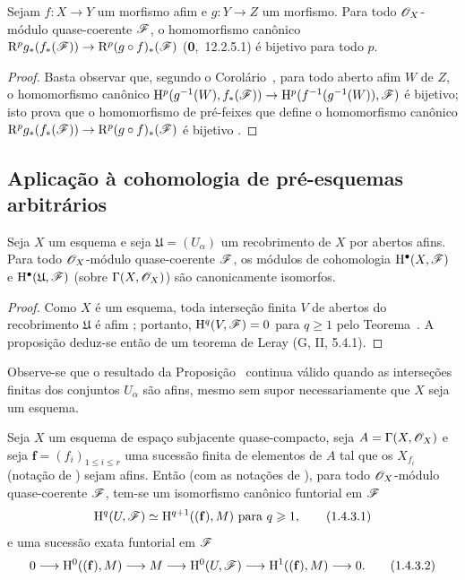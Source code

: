 \begin{corollary}[1.3.4]
\label{III.1.3.4}
Sejam $f:X\to Y$ um morfismo afim e $g:Y\to Z$ um morfismo.
Para todo $\mathscr{O}_X$-módulo quase-coerente $\mathscr{F}$, o homomorfismo canônico $\RR^p g_*(f_*(\sh{F}))\to\RR^p(g\circ f)_*(\sh{F})$ (\textbf{0},~12.2.5.1) é bijetivo para todo $p$.
\end{corollary}

\begin{proof}
Basta observar que, segundo o Corolário~, para todo aberto afim $W$ de $Z$, o homomorfismo canônico $\HH^p(g^{-1}(W),f_*(\sh{F}))\to\HH^p(f^{-1}(g^{-1}(W)),\sh{F})$ é bijetivo; isto prova que o homomorfismo de pré-feixes que define o homomorfismo canônico $\RR^p g_*(f_*(\sh{F}))\to\RR^p(g\circ f)_*(\sh{F})$ é bijetivo .
\end{proof}

\subsection{Aplicação à cohomologia de pré-esquemas arbitrários}
\label{subsection:III.1.4}

\begin{proposition}[1.4.1]
\label{III.1.4.1}
Seja $X$ um esquema e seja $\mathfrak{U}=(U_\alpha)$ um recobrimento de $X$ por abertos afins.
Para todo $\mathscr{O}_X$-módulo quase-coerente $\mathscr{F}$, os módulos de cohomologia $\mathrm{H}^\bullet(X,\mathscr{F})$ e $\mathrm{H}^\bullet(\mathfrak{U},\mathscr{F})$ (sobre $\Gamma(X,\mathscr{O}_X)$) são canonicamente isomorfos.
\end{proposition}

\begin{proof}
Como $X$ é um esquema, toda interseção finita $V$ de abertos do recobrimento $\mathfrak{U}$ é afim ; portanto, $\mathrm{H}^q(V,\mathscr{F})=0$ para $q\geq 1$ pelo Teorema~.
A proposição deduz-se então de um teorema de Leray (G, II, 5.4.1).
\end{proof}

\begin{remark}[1.4.2]
\label{III.1.4.2}
Observe-se que o resultado da Proposição~ continua válido quando as interseções finitas dos conjuntos $U_\alpha$ são afins, mesmo sem supor necessariamente que $X$ seja um esquema.
\end{remark}

\begin{corollary}[1.4.3]
\label{III.1.4.3}
Seja $X$ um esquema de espaço subjacente quase-compacto, seja $A=\Gamma(X,\mathscr{O}_X)$ e seja $\mathbf{f}=(f_i)_{1\leq i\leq r}$ uma sucessão finita de elementos de $A$ tal que os $X_{f_i}$ (notação de ) sejam afins.
Então (com as notações de ), para todo $\mathscr{O}_X$-módulo quase-coerente $\mathscr{F}$, tem-se um isomorfismo canônico funtorial em $\mathscr{F}$
\[
  \HH^q(U,\sh{F})\isoto\HH^{q+1}((\mathbf{f}),M)\text{ para }q\geq 1,
  \tag{1.4.3.1}\label{III.1.4.3.1}
\]
e uma sucessão exata funtorial em $\mathscr{F}$
\[
  0\to\HH^0((\mathbf{f}),M)\to M\to\HH^0(U,\sh{F})\to\HH^1((\mathbf{f}),M)\to 0.
  \tag{1.4.3.2}
\]
\end{corollary}

